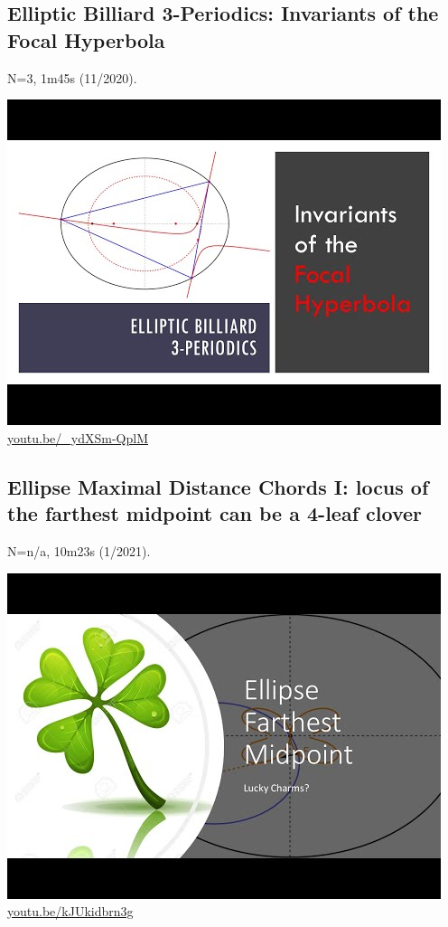 \documentclass[12pt]{amsart}
\begin{document}
\subsection{Elliptic Billiard 3-Periodics: Invariants of the Focal Hyperbola}
\label{vid:_ydXSm-QplM}
\noindent N=3, 1m45s (11/2020). 
\begin{center}\includegraphics[width=.5\textwidth]{pics/_ydXSm-QplM.jpg} \\ 
\href{https://youtu.be/_ydXSm-QplM}{\url{youtu.be/\_ydXSm-QplM}}\end{center}
% 

\subsection{Ellipse Maximal Distance Chords I: locus of the farthest midpoint can be a 4-leaf clover}
\label{vid:kJUkidbrn3g}
\noindent N=n/a, 10m23s (1/2021). 
\begin{center}\includegraphics[width=.5\textwidth]{pics/kJUkidbrn3g.jpg} \\ 
\href{https://youtu.be/kJUkidbrn3g}{\url{youtu.be/kJUkidbrn3g}}\end{center}
% 
\end{document}
